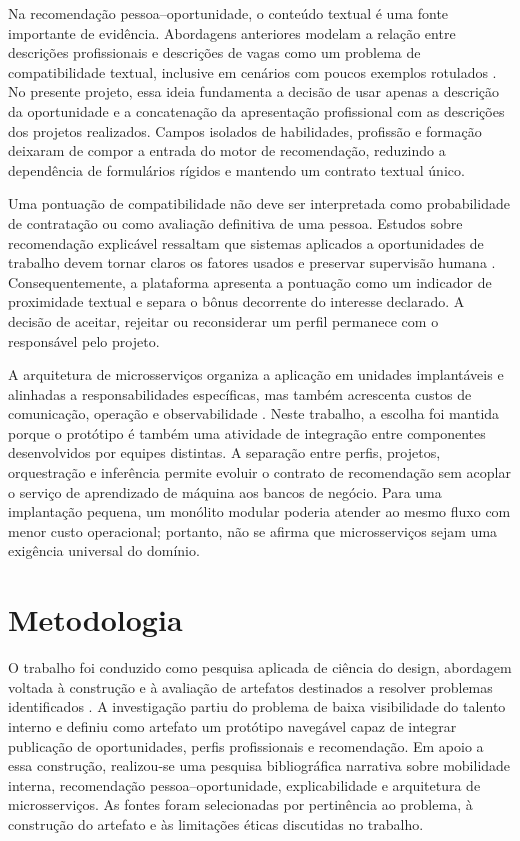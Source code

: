 \documentclass[12pt]{article}
\begin{document}
Na recomendação pessoa--oportunidade, o conteúdo textual é uma fonte importante de evidência. Abordagens anteriores modelam a relação entre descrições profissionais e descrições de vagas como um problema de compatibilidade textual, inclusive em cenários com poucos exemplos rotulados \cite{bian2019domain}. No presente projeto, essa ideia fundamenta a decisão de usar apenas a descrição da oportunidade e a concatenação da apresentação profissional com as descrições dos projetos realizados. Campos isolados de habilidades, profissão e formação deixaram de compor a entrada do motor de recomendação, reduzindo a dependência de formulários rígidos e mantendo um contrato textual único.

Uma pontuação de compatibilidade não deve ser interpretada como probabilidade de contratação ou como avaliação definitiva de uma pessoa. Estudos sobre recomendação explicável ressaltam que sistemas aplicados a oportunidades de trabalho devem tornar claros os fatores usados e preservar supervisão humana \cite{tang2025explainable}. Consequentemente, a plataforma apresenta a pontuação como um indicador de proximidade textual e separa o bônus decorrente do interesse declarado. A decisão de aceitar, rejeitar ou reconsiderar um perfil permanece com o responsável pelo projeto.

A arquitetura de microsserviços organiza a aplicação em unidades implantáveis e alinhadas a responsabilidades específicas, mas também acrescenta custos de comunicação, operação e observabilidade \cite{pahl2016microservices}. Neste trabalho, a escolha foi mantida porque o protótipo é também uma atividade de integração entre componentes desenvolvidos por equipes distintas. A separação entre perfis, projetos, orquestração e inferência permite evoluir o contrato de recomendação sem acoplar o serviço de aprendizado de máquina aos bancos de negócio. Para uma implantação pequena, um monólito modular poderia atender ao mesmo fluxo com menor custo operacional; portanto, não se afirma que microsserviços sejam uma exigência universal do domínio.

\section{Metodologia}

O trabalho foi conduzido como pesquisa aplicada de ciência do design, abordagem voltada à construção e à avaliação de artefatos destinados a resolver problemas identificados \cite{peffers2007design}. A investigação partiu do problema de baixa visibilidade do talento interno e definiu como artefato um protótipo navegável capaz de integrar publicação de oportunidades, perfis profissionais e recomendação. Em apoio a essa construção, realizou-se uma pesquisa bibliográfica narrativa sobre mobilidade interna, recomendação pessoa--oportunidade, explicabilidade e arquitetura de microsserviços. As fontes foram selecionadas por pertinência ao problema, à construção do artefato e às limitações éticas discutidas no trabalho.
\end{document}
